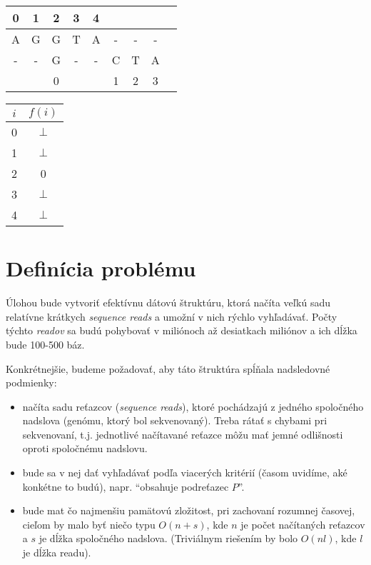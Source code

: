 \begin{example}
        \begin{minipage}{2.5in}
            \begin{tabular}{ c c c c c c c c c }
                0 & 1 & 2 & 3 & 4 &           \\ \hline     
                A & G & G & T & A & - & - & - \\
                - & - & G & - & - & C & T & A \\ \hline
                  &   & 0 &   &   & 1 & 2 & 3 \\   
            \end{tabular}
        \end{minipage}
        \begin{minipage}{2.5in}
            \begin{tabular}{ | c | c | }
                \hline            
                $i$ & $f(i)$ \\ \hline             
                0   & $\bot$ \\ \hline 
                1   & $\bot$ \\ \hline
                2   & 0      \\ \hline
                3   & $\bot$ \\ \hline
                4   & $\bot$ \\ \hline
            \end{tabular}
        \end{minipage}        
    \end{example}
    
\bigskip
    

\section{Definícia problému}

Úlohou bude vytvoriť efektívnu dátovú štruktúru, ktorá načíta veľkú sadu
relatívne krátkych \emph{sequence reads} a umožní v nich rýchlo vyhľadávať.
Počty týchto \emph{readov} sa budú pohybovať v miliónoch až desiatkach miliónov
a ich dĺžka bude 100-500 báz. 

Konkrétnejšie, budeme požadovať, aby táto štruktúra spĺňala nadsledovné
podmienky:

\begin{itemize}
    \item načíta sadu reťazcov (\emph{sequence reads}), ktoré pochádzajú z
    jedného spoločného nadslova (genómu, ktorý bol sekvenovaný). Treba rátať s
    chybami pri sekvenovaní, t.j. jednotlivé načítavané reťazce môžu mať jemné
    odlišnosti oproti spoločnému nadslovu.
    \item bude sa v nej dať vyhľadávať podľa viacerých kritérií (časom uvidíme,
    aké konkétne to budú), napr. ``obsahuje podreťazec $P$''.
    \item bude mat čo najmenšiu pamätovú zložitost, pri zachovaní rozumnej
    časovej, cieľom by malo byť niečo typu $O(n + s)$, kde $n$ je počet
    načítaných reťazcov a $s$ je dĺžka spoločného nadslova. (Triviálnym riešením
    by bolo $O(nl)$, kde $l$ je dĺžka readu).
\end{itemize}

